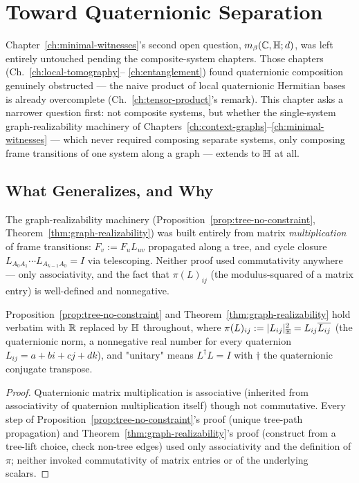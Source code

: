 \chapter{Toward Quaternionic Separation}
\label{ch:quaternionic}

Chapter~\ref{ch:minimal-witnesses}'s second open question,
$m_\beta(\mathbb{C},\mathbb{H};d)$, was left entirely untouched pending the
composite-system chapters. Those chapters (Ch.~\ref{ch:local-tomography}--
\ref{ch:entanglement}) found quaternionic composition genuinely
obstructed — the naive product of local quaternionic Hermitian bases is
already overcomplete (Ch.~\ref{ch:tensor-product}'s remark). This chapter
asks a narrower question first: not composite systems, but whether the
single-system graph-realizability machinery of
Chapters~\ref{ch:context-graphs}--\ref{ch:minimal-witnesses} — which never
required composing separate systems, only composing frame transitions of
one system along a graph — extends to $\mathbb{H}$ at all.

\section{What Generalizes, and Why}

The graph-realizability machinery (Proposition~\ref{prop:tree-no-constraint},
Theorem~\ref{thm:graph-realizability}) was built entirely from matrix
\emph{multiplication} of frame transitions: $F_v := F_uL_{uv}$ propagated
along a tree, and cycle closure $L_{A_0A_1}\cdots L_{A_{k-1}A_0}=I$ via
telescoping. Neither proof used commutativity anywhere — only
associativity, and the fact that $\pi(L)_{ij}$ (the modulus-squared of a
matrix entry) is well-defined and nonnegative.

\begin{proposition}
\label{prop:h-generalizes}
Proposition~\ref{prop:tree-no-constraint} and
Theorem~\ref{thm:graph-realizability} hold verbatim with $\mathbb{R}$ replaced by
$\mathbb{H}$ throughout, where $\pi(L)_{ij} := |L_{ij}|_{\mathbb{H}}^2 = L_{ij}
\overline{L_{ij}}$ (the quaternionic norm, a nonnegative real number for
every quaternion $L_{ij} = a+bi+cj+dk$), and "unitary" means
$L^\dagger L = I$ with $\dagger$ the quaternionic conjugate transpose.
\end{proposition}

\begin{proof}
Quaternionic matrix multiplication is associative (inherited from
associativity of quaternion multiplication itself) though not commutative.
Every step of Proposition~\ref{prop:tree-no-constraint}'s proof (unique
tree-path propagation) and Theorem~\ref{thm:graph-realizability}'s proof
(construct from a tree-lift choice, check non-tree edges) used only
associativity and the definition of $\pi$; neither invoked commutativity of
matrix entries or of the underlying scalars.
\end{proof}

